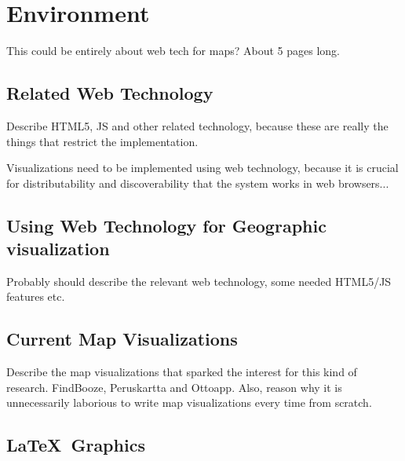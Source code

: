 
\chapter{Environment}
\label{chapter:environment}

This could be entirely about web tech for maps? About 5 pages long.

\section{Related Web Technology}

Describe HTML5, JS and other related technology, because these are really the things that restrict the implementation.

Visualizations need to be implemented using web technology, because it is crucial for distributability and discoverability that the system works in web browsers... 

\section{Using Web Technology for Geographic visualization}

Probably should describe the relevant web technology, some needed HTML5/JS features etc. 

\section{Current Map Visualizations} %

Describe the map visualizations that sparked the interest for this kind of research. FindBooze, Peruskartta and Ottoapp. Also, reason why it is unnecessarily laborious to write map visualizations every time from scratch. 



\section{\LaTeX\ Graphics}

